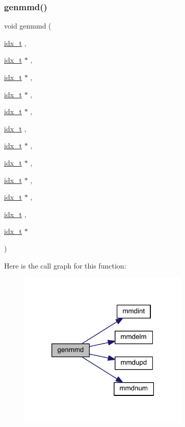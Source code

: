 \subsubsection{\texorpdfstring{genmmd()}{genmmd()}}
{\footnotesize\ttfamily void genmmd (\begin{DoxyParamCaption}\item[{\hyperlink{a00876_aaa5262be3e700770163401acb0150f52}{idx\+\_\+t}}]{,  }\item[{\hyperlink{a00876_aaa5262be3e700770163401acb0150f52}{idx\+\_\+t} $\ast$}]{,  }\item[{\hyperlink{a00876_aaa5262be3e700770163401acb0150f52}{idx\+\_\+t} $\ast$}]{,  }\item[{\hyperlink{a00876_aaa5262be3e700770163401acb0150f52}{idx\+\_\+t} $\ast$}]{,  }\item[{\hyperlink{a00876_aaa5262be3e700770163401acb0150f52}{idx\+\_\+t} $\ast$}]{,  }\item[{\hyperlink{a00876_aaa5262be3e700770163401acb0150f52}{idx\+\_\+t}}]{,  }\item[{\hyperlink{a00876_aaa5262be3e700770163401acb0150f52}{idx\+\_\+t} $\ast$}]{,  }\item[{\hyperlink{a00876_aaa5262be3e700770163401acb0150f52}{idx\+\_\+t} $\ast$}]{,  }\item[{\hyperlink{a00876_aaa5262be3e700770163401acb0150f52}{idx\+\_\+t} $\ast$}]{,  }\item[{\hyperlink{a00876_aaa5262be3e700770163401acb0150f52}{idx\+\_\+t} $\ast$}]{,  }\item[{\hyperlink{a00876_aaa5262be3e700770163401acb0150f52}{idx\+\_\+t}}]{,  }\item[{\hyperlink{a00876_aaa5262be3e700770163401acb0150f52}{idx\+\_\+t} $\ast$}]{ }\end{DoxyParamCaption})}

Here is the call graph for this function\+:\nopagebreak
\begin{figure}[H]
\begin{center}
\leavevmode
\includegraphics[width=230pt]{a00945_a1a9713647a69a41fb87323964119ab40_cgraph}
\end{center}
\end{figure}
\mbox{\label{a00945_aaa70dea85e3a1149132362c93099d543}} 
